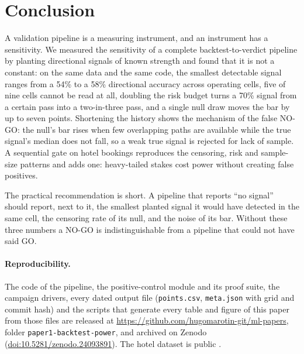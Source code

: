 \documentclass[11pt]{article}
\begin{document}
\section{Conclusion}
\label{sec:conclusion}

A validation pipeline is a measuring instrument, and an instrument has a sensitivity. We measured the sensitivity of a complete backtest-to-verdict pipeline by planting directional signals of known strength and found that it is not a constant: on the same data and the same code, the smallest detectable signal ranges from a 54\% to a 58\% directional accuracy across operating cells, five of nine cells cannot be read at all, doubling the risk budget turns a 70\% signal from a certain pass into a two-in-three pass, and a single null draw moves the bar by up to seven points. Shortening the history shows the mechanism of the false NO-GO: the null's bar rises when few overlapping paths are available while the true signal's median does not fall, so a weak true signal is rejected for lack of sample. A sequential gate on hotel bookings reproduces the censoring, risk and sample-size patterns and adds one: heavy-tailed stakes cost power without creating false positives.

The practical recommendation is short. A pipeline that reports ``no signal'' should report, next to it, the smallest planted signal it would have detected in the same cell, the censoring rate of its null, and the noise of its bar. Without these three numbers a NO-GO is indistinguishable from a pipeline that could not have said GO.

\paragraph{Reproducibility.}
The code of the pipeline, the positive-control module and its proof suite, the campaign drivers, every dated output file (\texttt{points.csv}, \texttt{meta.json} with grid and commit hash) and the scripts that generate every table and figure of this paper from those files are released at \url{https://github.com/hugomarotin-git/ml-papers}, folder \texttt{paper1-backtest-power}, and archived on Zenodo (\href{https://doi.org/10.5281/zenodo.24093891}{doi:10.5281/zenodo.24093891}). The hotel dataset is public \citep{antonio2019}.



\end{document}
